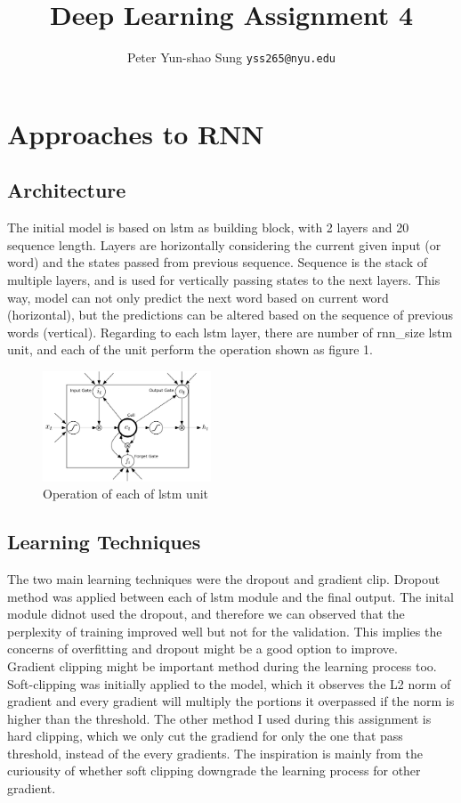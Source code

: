 \documentclass{article}
\title{Deep Learning Assignment 4}
\author{
  Peter Yun-shao Sung
  \texttt{yss265@nyu.edu} \\
}
\begin{document}

\maketitle
\section{Approaches to RNN}
\subsection{Architecture}
The initial model is based on lstm as building block, with 2 layers and 20 sequence length. Layers are horizontally considering the current given input (or word) and the states passed from previous sequence. Sequence is the stack of multiple layers, and is used for vertically passing states to the next layers. This way, model can not only predict the next word based on current word (horizontal), but the predictions can be altered based on the sequence of previous words (vertical). Regarding to each lstm layer, there are number of rnn\_size lstm unit, and each of the unit perform the operation shown as figure 1.

\begin{figure}[h]
\centering
\includegraphics[width=50mm]{./fig/lstm.png}
  \caption{Operation of each of lstm unit}
\end{figure}

\subsection{Learning Techniques}
The two main learning techniques were the dropout and gradient clip. Dropout method was applied between each of lstm module and the final output. The inital module didnot used the dropout, and therefore we can observed that the perplexity of training improved well but not for the validation. This implies the concerns of overfitting and dropout might be a good option to improve.\\
Gradient clipping might be important method during the learning process too. Soft-clipping was initially applied to the model, which it observes the L2 norm of gradient and every gradient will multiply the portions it overpassed if the norm is higher than the threshold. The other method I used during this assignment is hard clipping, which we only cut the gradiend for only the one that pass threshold, instead of the every gradients. The inspiration is mainly from the curiousity of whether soft clipping downgrade the learning process for other gradient.
\end{document}
